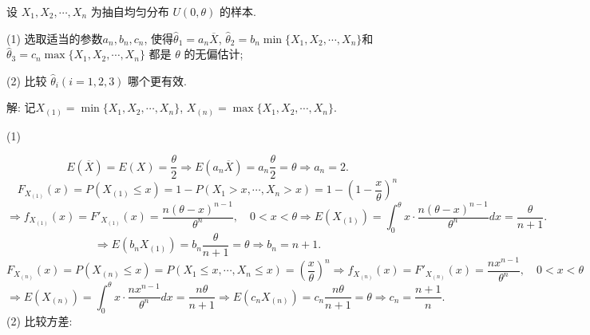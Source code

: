 \documentclass[standard]{ExBook}
\renewenvironment{shaded}{%
  \def\FrameCommand{\fboxsep=\FrameSep \colorbox{shadecolor}}%
  \MakeFramed{\advance\hsize-\width \FrameRestore}%
}{%
  \endMakeFramed
}
\begin{document}
\begin{qitems}
\vspace{2.5cm-5em}

    \begin{bbox}
    \begin{shaded}
        \qitem
设 \(X_1, X_2, \cdots, X_n\) 为抽自均匀分布 \(U(0, \theta)\) 的样本.

(1) 选取适当的参数\(a_n, b_n, c_n\), 使得\(\hat{\theta}_1 = a_n \overline{X}\), \(\hat{\theta}_2 = b_n \min\{X_1, X_2, \cdots, X_n\}\)和\(\hat{\theta}_3 = c_n \max\{X_1, X_2, \cdots, X_n\}\) 都是 \(\theta\) 的无偏估计;

(2) 比较 \(\hat{\theta}_i (i = 1, 2, 3)\) 哪个更有效.
    \end{shaded}
    \end{bbox}

\vspace{\dimexpr2.5cm-5em\relax}

解: 记$X_{(1)}=\min\{X_1,X_2,\cdots,X_n\}$, $X_{(n)}=\max\{X_1,X_2,\cdots,X_n\}$.

(1)

$$
E(\overline{X})=E(X)=\frac{\theta}{2}
\Longrightarrow
E(a_n\overline{X})=a_n\frac{\theta}{2}=\theta
\Longrightarrow
a_n=2.
$$
$$
F_{X_{(1)}}(x)=P(X_{(1)}\leq x)=1-P(X_1>x,\cdots,X_n>x)=1-\left(1-\frac{x}{\theta}\right)^n
$$
$$
\Longrightarrow
f_{X_{(1)}}(x)=F'_{X_{(1)}}(x)=\frac{n(\theta-x)^{n-1}}{\theta^n},\quad 0<x<\theta
\Longrightarrow
E(X_{(1)})=\int_{0}^{\theta}x\cdot\frac{n(\theta-x)^{n-1}}{\theta^n}dx=\frac{\theta}{n+1}.
$$
$$
\Longrightarrow
E(b_nX_{(1)})=b_n\frac{\theta}{n+1}=\theta
\Longrightarrow
b_n=n+1.
$$
$$
F_{X_{(n)}}(x)=P(X_{(n)}\leq x)=P(X_1\leq x,\cdots,X_n\leq x)=\left(\frac{x}{\theta}\right)^n
\Longrightarrow
f_{X_{(n)}}(x)=F'_{X_{(n)}}(x)=\frac{nx^{n-1}}{\theta^n},\quad 0<x<\theta
$$
$$
\Longrightarrow
E(X_{(n)})=\int_{0}^{\theta}x\cdot\frac{nx^{n-1}}{\theta^n}dx=\frac{n\theta}{n+1}
\Longrightarrow
E(c_nX_{(n)})=c_n\frac{n\theta}{n+1}=\theta
\Longrightarrow
c_n=\frac{n+1}{n}.
$$
(2) 比较方差:


\end{qitems}
\end{document}
